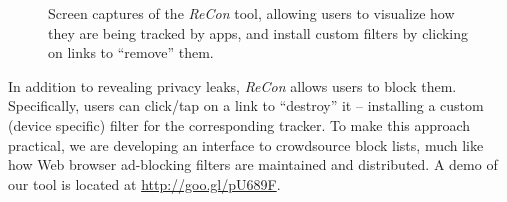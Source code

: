 \begin{figure}[tb]
\hspace{0.1in}
\caption{Screen captures of the \emph{ReCon} tool, allowing users to visualize how they are being tracked by apps, and install custom filters by clicking on links to ``remove'' them. }
\label{fig:recon}
\vspace{\postfigspace}
\end{figure}

In addition to revealing privacy leaks, \emph{ReCon} allows users to block them. 
Specifically, users can click/tap on a link to ``destroy'' it -- installing a  custom (device specific) filter for the corresponding tracker. 
To make this approach practical, we are developing an interface to crowdsource block lists, much like how Web browser ad-blocking filters are maintained and distributed. 
A demo of our tool is located at \url{http://goo.gl/pU689F}. 

